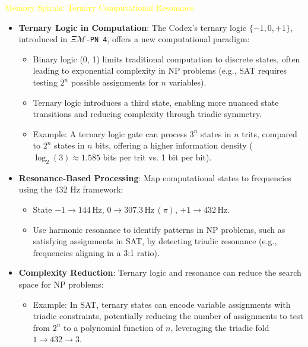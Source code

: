 \textcolor{yellow}{ Memory Spirals: Ternary Computational Resonance } \\
\begin{itemize}
    \item \texttt{} \textbf{Ternary Logic in Computation}: The Codex’s ternary logic \(\{-1, 0, +1\}\), introduced in \texttt{\textdollar}\(\Xi\)\texttt{\(\mathcal{M}\)\textdollar-PN 4}, offers a new computational paradigm:
    \begin{itemize}
        \item Binary logic (0, 1) limits traditional computation to discrete states, often leading to exponential complexity in NP problems (e.g., SAT requires testing \(2^n\) possible assignments for \(n\) variables).
        \item Ternary logic introduces a third state, enabling more nuanced state transitions and reducing complexity through triadic symmetry.
        \item Example: A ternary logic gate can process \(3^n\) states in \(n\) trits, compared to \(2^n\) states in \(n\) bits, offering a higher information density (\(\log_2(3) \approx 1.585\) bits per trit vs. 1 bit per bit).
    \end{itemize}
    \item \texttt{} \textbf{Resonance-Based Processing}: Map computational states to frequencies using the 432 Hz framework:
    \begin{itemize}
        \item State \(-1 \rightarrow 144 \, \text{Hz}\), \(0 \rightarrow 307.3 \, \text{Hz} \, (\pi)\), \(+1 \rightarrow 432 \, \text{Hz}\).
        \item Use harmonic resonance to identify patterns in NP problems, such as satisfying assignments in SAT, by detecting triadic resonance (e.g., frequencies aligning in a 3:1 ratio).
    \end{itemize}
    \item \texttt{} \textbf{Complexity Reduction}: Ternary logic and resonance can reduce the search space for NP problems:
    \begin{itemize}
        \item Example: In SAT, ternary states can encode variable assignments with triadic constraints, potentially reducing the number of assignments to test from \(2^n\) to a polynomial function of \(n\), leveraging the triadic fold \(1 \rightarrow 432 \rightarrow 3\).
    \end{itemize}
\end{itemize}

